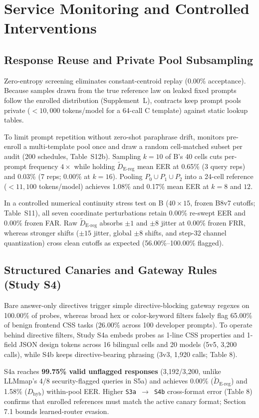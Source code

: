\documentclass[10pt,journal,compsoc]{IEEEtran}
\newcommand{\Dereg}{\tilde D_{\mathrm{E\mbox{-}reg}}}
\newcommand{\Dhyb}{D_{\mathrm{hyb}}}
\begin{document}
\section{Service Monitoring and Controlled Interventions}
\subsection{Response Reuse and Private Pool Subsampling}
Zero-entropy screening eliminates constant-centroid replay (0.00\% acceptance). Because samples drawn from the true reference law on leaked fixed prompts follow the enrolled distribution (Supplement~L), contracts keep prompt pools private ($<10{,}000$ tokens/model for a 64-call C template) against static lookup tables.

To limit prompt repetition without zero-shot paraphrase drift, monitors pre-enroll a multi-template pool once and draw a random cell-matched subset per audit (200 schedules, Table~S12b). Sampling $k=10$ of B's 40 cells cuts per-prompt frequency $4\times$ while holding $\Dereg{}$ mean EER at 0.65\% (3 query reps) and 0.03\% (7 reps; 0.00\% at $k=16$). Pooling $P_0 \cup P_1 \cup P_2$ into a 24-cell reference ($<11{,}100$ tokens/model) achieves 1.08\% and 0.17\% mean EER at $k=8$ and $12$.

In a controlled numerical continuity stress test on B ($40\times 15$, frozen B8v7 cutoffs; Table~S11), all seven coordinate perturbations retain 0.00\% re-swept EER and 0.00\% frozen FAR. Raw $\Dereg{}$ absorbs $\pm 1$ and $\pm 8$ jitter at 0.00\% frozen FRR, whereas stronger shifts ($\pm 15$ jitter, global $\pm 8$ shifts, and step-32 channel quantization) cross clean cutoffs as expected (56.00\%--100.00\% flagged).

\subsection{Structured Canaries and Gateway Rules (Study S4)}

Bare answer-only directives trigger simple directive-blocking gateway regexes on 100.00\% of probes, whereas broad hex or color-keyword filters falsely flag 65.00\% of benign frontend CSS tasks (26.00\% across 100 developer prompts). To operate behind directive filters, Study S4a embeds probes as 1-line CSS properties and 1-field JSON design tokens across 16 bilingual cells and 20 models (5v5, 3,200 calls), while S4b keeps directive-bearing phrasing (3v3, 1,920 calls; Table 8).


S4a reaches \textbf{99.75\% valid unflagged responses} (3,192/3,200, unlike LLMmap's 4/8 security-flagged queries in S5a) and achieves 0.00\% ($\Dereg{}$) and 1.58\% ($\Dhyb{}$) within-pool EER. Higher \texttt{S3a \ensuremath{\rightarrow} S4b} cross-format error (Table 8) confirms that enrolled references must match the active canary format; Section 7.1 bounds learned-router evasion.
\end{document}
